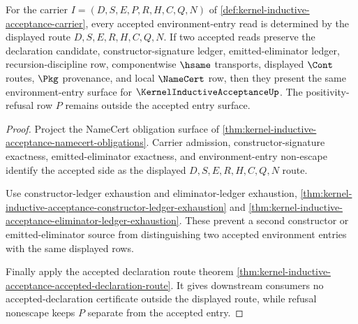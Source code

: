 \begin{theorem}
\label{thm:kernel-inductive-acceptance-environment-entry-determinacy}
For the carrier $I=(D,S,E,P,R,H,C,Q,N)$ of \autoref{def:kernel-inductive-acceptance-carrier}, every accepted environment-entry read is determined by the displayed route $D,S,E,R,H,C,Q,N$. If two accepted reads preserve the declaration candidate, constructor-signature ledger, emitted-eliminator ledger, recursion-discipline row, componentwise $\hsame$ transports, displayed $\Cont$ routes, $\Pkg$ provenance, and local $\NameCert$ row, then they present the same environment-entry surface for $\KernelInductiveAcceptanceUp$. The positivity-refusal row $P$ remains outside the accepted entry surface.
\end{theorem}
\begin{proof}
Project the NameCert obligation surface of \autoref{thm:kernel-inductive-acceptance-namecert-obligations}. Carrier admission, constructor-signature exactness, emitted-eliminator exactness, and environment-entry non-escape identify the accepted side as the displayed $D,S,E,R,H,C,Q,N$ route.

Use constructor-ledger exhaustion and eliminator-ledger exhaustion, \autoref{thm:kernel-inductive-acceptance-constructor-ledger-exhaustion} and \autoref{thm:kernel-inductive-acceptance-eliminator-ledger-exhaustion}. These prevent a second constructor or emitted-eliminator source from distinguishing two accepted environment entries with the same displayed rows.

Finally apply the accepted declaration route theorem \autoref{thm:kernel-inductive-acceptance-accepted-declaration-route}. It gives downstream consumers no accepted-declaration certificate outside the displayed route, while refusal nonescape keeps $P$ separate from the accepted entry.
\end{proof}

